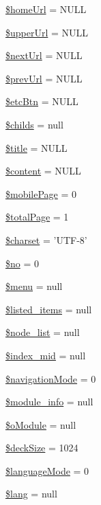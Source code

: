 \begin{DoxyCompactItemize}
\item 
\hyperlink{classmobileXE_abff078bb36c02394447e55be4500b762}{\$home\-Url} = N\-U\-L\-L
\item 
\hyperlink{classmobileXE_a643b9ca5393066afea26819e4f1cf115}{\$upper\-Url} = N\-U\-L\-L
\item 
\hyperlink{classmobileXE_adbdb5909b975bb776f91817d2392aaca}{\$next\-Url} = N\-U\-L\-L
\item 
\hyperlink{classmobileXE_acbc08c3fe06a6a5aaae6cbdc8738559f}{\$prev\-Url} = N\-U\-L\-L
\item 
\hyperlink{classmobileXE_adac4ec3b5f46d10ac063ccba83f8ffa7}{\$etc\-Btn} = N\-U\-L\-L
\item 
\hyperlink{classmobileXE_ae641a3f98d4d95afe77f56456532aff7}{\$childs} = null
\item 
\hyperlink{classmobileXE_aeb2ef82029883fd60174e3d0e9f7dcc3}{\$title} = N\-U\-L\-L
\item 
\hyperlink{classmobileXE_a827bc8119bac862a05a1c192125bf125}{\$content} = N\-U\-L\-L
\item 
\hyperlink{classmobileXE_a4017307825d19d450c677b25b70eab5e}{\$mobile\-Page} = 0
\item 
\hyperlink{classmobileXE_a0d7bcada3689f84f67337d02c8dd6f21}{\$total\-Page} = 1
\item 
\hyperlink{classmobileXE_ae49d948fe651953a56bac2a907f6057a}{\$charset} = 'U\-T\-F-\/8'
\item 
\hyperlink{classmobileXE_a497e828014cdb6eaef56dd42d0f816e6}{\$no} = 0
\item 
\hyperlink{classmobileXE_a0ebb4296d28c9cb49fabb4d1252c1434}{\$menu} = null
\item 
\hyperlink{classmobileXE_abd07e5909154b43a31e2ebff5d51e4c7}{\$listed\-\_\-items} = null
\item 
\hyperlink{classmobileXE_af906479c52f412d0beae2252bad4ef35}{\$node\-\_\-list} = null
\item 
\hyperlink{classmobileXE_a9e93ed38eed50085338e8128ab4015ab}{\$index\-\_\-mid} = null
\item 
\hyperlink{classmobileXE_aa6e85b2d6fe4667d7d0a3a2b3f13bd12}{\$navigation\-Mode} = 0
\item 
\hyperlink{classmobileXE_a926916a0195e056ccfdaf284e56b0ea6}{\$module\-\_\-info} = null
\item 
\hyperlink{classmobileXE_a64908b5e1d46537b4739036b1a00b689}{\$o\-Module} = null
\item 
\hyperlink{classmobileXE_a3d9450dc37a10f7bb11801ab29c000ed}{\$deck\-Size} = 1024
\item 
\hyperlink{classmobileXE_a70ee01279ea1bcdd609905e80e4544b7}{\$language\-Mode} = 0
\item 
\hyperlink{classmobileXE_a126d781fe75edb57ef2718f5a6e26d82}{\$lang} = null
\end{DoxyCompactItemize}


